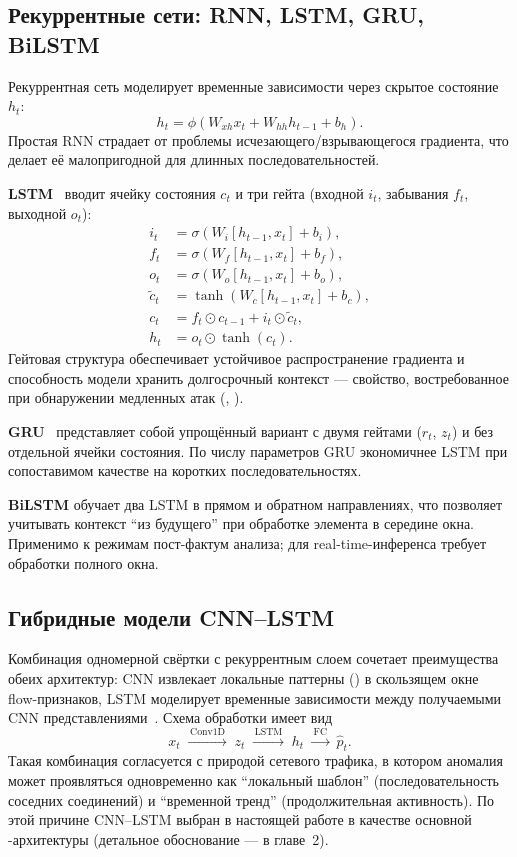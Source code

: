 \subsection{Рекуррентные сети: RNN, LSTM, GRU, BiLSTM}

Рекуррентная сеть моделирует временные зависимости через скрытое состояние
\(h_t\):
\begin{equation}
h_t = \phi(W_{xh} x_t + W_{hh} h_{t-1} + b_h).
\label{eq:rnn}
\end{equation}
Простая RNN страдает от проблемы исчезающего/взрывающегося градиента, что
делает её малопригодной для длинных последовательностей.

\textbf{LSTM}~\cite{hochreiter1997lstm} вводит ячейку состояния
\(c_t\) и три гейта (входной \(i_t\), забывания \(f_t\), выходной \(o_t\)):
\begin{align}
i_t &= \sigma(W_i [h_{t-1}, x_t] + b_i),\\
f_t &= \sigma(W_f [h_{t-1}, x_t] + b_f),\\
o_t &= \sigma(W_o [h_{t-1}, x_t] + b_o),\\
\tilde{c}_t &= \tanh(W_c [h_{t-1}, x_t] + b_c),\\
c_t &= f_t \odot c_{t-1} + i_t \odot \tilde{c}_t,\\
h_t &= o_t \odot \tanh(c_t).
\label{eq:lstm}
\end{align}
Гейтовая структура обеспечивает устойчивое распространение градиента и
способность модели хранить долгосрочный контекст --- свойство, востребованное
при обнаружении медленных атак (, ).

\textbf{GRU}~\cite{cho2014gru} представляет собой упрощённый вариант с двумя
гейтами (\(r_t\), \(z_t\)) и без отдельной ячейки состояния. По числу
параметров GRU экономичнее LSTM при сопоставимом качестве на коротких
последовательностях.

\textbf{BiLSTM} обучает два LSTM в прямом и обратном направлениях, что
позволяет учитывать контекст ``из будущего'' при обработке элемента в
середине окна. Применимо к режимам пост-фактум анализа; для
real-time-инференса требует обработки полного окна.

\subsection{Гибридные модели CNN--LSTM}

Комбинация одномерной свёртки с рекуррентным слоем сочетает преимущества обеих
архитектур: CNN извлекает локальные паттерны () в
скользящем окне flow-признаков, LSTM моделирует временные зависимости между
получаемыми CNN представлениями~\cite{vinayakumar2019dl, kim2016lstm}. Схема
обработки имеет вид
\[
x_t \;\xrightarrow{\,\text{Conv1D}\,}\; z_t \;\xrightarrow{\,\text{LSTM}\,}\; h_t
\;\xrightarrow{\,\text{FC}\,}\; \hat{p}_t.
\]
Такая комбинация согласуется с природой сетевого трафика, в котором аномалия
может проявляться одновременно как ``локальный шаблон'' (последовательность
соседних соединений) и ``временной тренд'' (продолжительная активность). По
этой причине CNN--LSTM выбран в настоящей работе в качестве основной
-архитектуры (детальное обоснование --- в главе~2).

